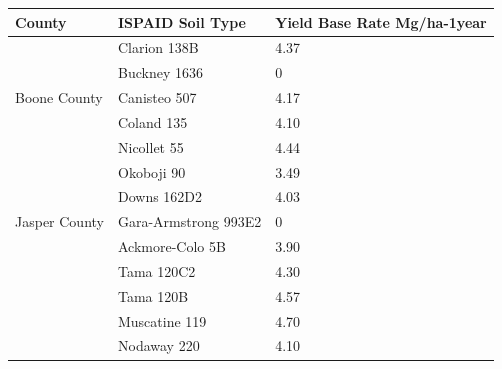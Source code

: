 \documentclass[11pt]{article}
\begin{document}
\begin{table}[H]
\centering
\begin{tabular}{|l|l|l|l|l|l|}
\hline
\multicolumn{2}{|l|}{County}                  & \multicolumn{2}{|l|}{ISPAID Soil Type} & \multicolumn{2}{|l|}{Yield Base Rate Mg/ha-1year} \\ 
\hline
\multicolumn{2}{|l|}{\multirow{5}{*}{Boone County}} & \multicolumn{2}{|l|}{Clarion 138B} & \multicolumn{2}{|l|}{4.37} \\ 
\cline{3-6} 
\multicolumn{2}{|l|}{}                  & \multicolumn{2}{|l|}{Buckney 1636} & \multicolumn{2}{|l|}{0} \\ 
\cline{3-6} 
\multicolumn{2}{|l|}{}                  & \multicolumn{2}{|l|}{Canisteo 507} & \multicolumn{2}{|l|}{4.17} \\ 
\cline{3-6} 
\multicolumn{2}{|l|}{}                  & \multicolumn{2}{|l|}{Coland 135} & \multicolumn{2}{|l|}{4.10} \\ 
\cline{3-6} 
\multicolumn{2}{|l|}{}                  & \multicolumn{2}{|l|}{Nicollet 55} & \multicolumn{2}{|l|}{4.44} \\ 
\cline{3-6}
\multicolumn{2}{|l|}{}                  & \multicolumn{2}{|l|}{Okoboji 90} & \multicolumn{2}{|l|}{3.49} \\ 
\hline
\multicolumn{2}{|l|}{\multirow{3}{*}{Jasper County}} & \multicolumn{2}{|l|}{Downs 162D2} & \multicolumn{2}{|l|}{4.03} \\ 
\cline{3-6} 
\multicolumn{2}{|l|}{}                  & \multicolumn{2}{|l|}{Gara-Armstrong 993E2} & \multicolumn{2}{|l|}{0} \\ 
\cline{3-6} 
\multicolumn{2}{|l|}{}                  & \multicolumn{2}{|l|}{Ackmore-Colo 5B} & \multicolumn{2}{|l|}{3.90} \\ 
\cline{3-6} 
\multicolumn{2}{|l|}{}                  & \multicolumn{2}{|l|}{Tama 120C2} & \multicolumn{2}{|l|}{4.30} \\ 
\cline{3-6} 
\multicolumn{2}{|l|}{}                  & \multicolumn{2}{|l|}{Tama 120B} & \multicolumn{2}{|l|}{4.57} \\ 
\cline{3-6} 
\multicolumn{2}{|l|}{}                  & \multicolumn{2}{|l|}{Muscatine 119} & \multicolumn{2}{|l|}{4.70} \\ 
\cline{3-6} 
\multicolumn{2}{|l|}{}                  & \multicolumn{2}{|l|}{Nodaway 220} & \multicolumn{2}{|l|}{4.10} \\ 
\hline
\end{tabular}
\end{table}
\end{document}
